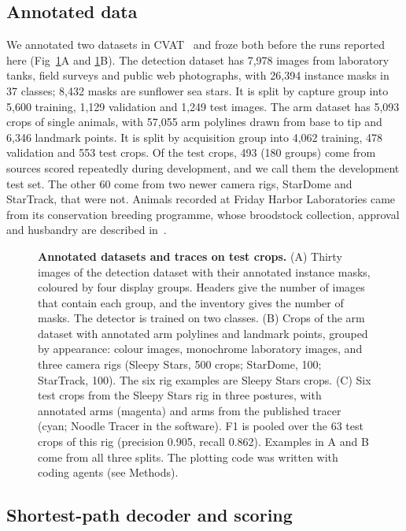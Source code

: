 \subsection*{Annotated data}

We annotated two datasets in CVAT~\cite{cvat2026computer} and froze both before the runs reported here (Fig~\ref{fig:data}A and \ref{fig:data}B).
The detection dataset has 7,978 images from laboratory tanks, field surveys and public web photographs, with 26,394 instance masks in 37 classes; 8,432 masks are sunflower sea stars.
It is split by capture group into 5,600 training, 1,129 validation and 1,249 test images.
The arm dataset has 5,093 crops of single animals, with 57,055 arm polylines drawn from base to tip and 6,346 landmark points.
It is split by acquisition group into 4,062 training, 478 validation and 553 test crops.
Of the test crops, 493 (180 groups) come from sources scored repeatedly during development, and we call them the development test set.
The other 60 come from two newer camera rigs, StarDome and StarTrack, that were not.
Animals recorded at Friday Harbor Laboratories came from its conservation breeding programme, whose broodstock collection, approval and husbandry are described in~\cite{hodin2025star}.

\begin{figure}[!ht]
\caption{{\bf Annotated datasets and traces on test crops.}
(A) Thirty images of the detection dataset with their annotated instance masks, coloured by four display groups. Headers give the number of images that contain each group, and the inventory gives the number of masks. The detector is trained on two classes.
(B) Crops of the arm dataset with annotated arm polylines and landmark points, grouped by appearance: colour images, monochrome laboratory images, and three camera rigs (Sleepy Stars, 500 crops; StarDome, 100; StarTrack, 100). The six rig examples are Sleepy Stars crops.
(C) Six test crops from the Sleepy Stars rig in three postures, with annotated arms (magenta) and arms from the published tracer (cyan; Noodle Tracer in the software). F1 is pooled over the 63 test crops of this rig (precision 0.905, recall 0.862).
Examples in A and B come from all three splits. The plotting code was written with coding agents (see Methods).}
\label{fig:data}
\end{figure}

\subsection*{Shortest-path decoder and scoring}

